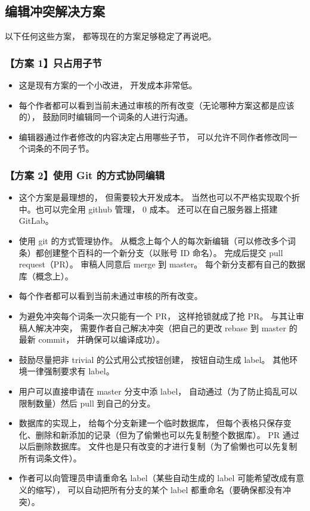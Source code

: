 \subsection{编辑冲突解决方案}

以下任何这些方案， 都等现在的方案足够稳定了再说吧。

\subsubsection{【方案 1】只占用子节}
\begin{itemize}
\item 这是现有方案的一个小改进， 开发成本非常低。
\item 每个作者都可以看到当前未通过审核的所有改变（无论哪种方案这都是应该的）， 鼓励同时编辑同一个词条的人进行沟通。
\item 编辑器通过作者修改的内容决定占用哪些子节， 可以允许不同作者修改同一个词条的不同子节。
\end{itemize}

\subsubsection{【方案 2】使用 Git 的方式协同编辑}
\begin{itemize}
\item 这个方案是最理想的， 但需要较大开发成本。 当然也可以不严格实现取个折中。也可以完全用 github 管理， 0 成本。 还可以在自己服务器上搭建 GitLab。
\item 使用 git 的方式管理协作。 从概念上每个人的每次新编辑（可以修改多个词条）都创建整个百科的一个新分支（以账号 ID 命名）。 完成后提交 pull request（PR）。 审稿人同意后 merge 到 master。 每个新分支都有自己的数据库（概念上）。
\item 每个作者都可以看到当前未通过审核的所有改变。
\item 为避免冲突每个词条一次只能有一个 PR， 这样抢锁就成了抢 PR。 与其让审稿人解决冲突， 需要作者自己解决冲突（把自己的更改 rebase 到 master 的最新 commit， 并确保可以编译成功）。
\item 鼓励尽量把非 trivial 的公式用公式按钮创建， 按钮自动生成 label。 其他环境一律强制要求有 label。
\item 用户可以直接申请在 master 分支中添 label， 自动通过（为了防止捣乱可以限制数量）然后 pull 到自己的分支。
\item 数据库的实现上， 给每个分支新建一个临时数据库， 但每个表格只保存变化、删除和新添加的记录（但为了偷懒也可以先复制整个数据库）。 PR 通过以后删除数据库。 文件也是只有改变的才进行复制（为了偷懒也可以先复制所有词条文件）。
\item 作者可以向管理员申请重命名 label（某些自动生成的 label 可能希望改成有意义的缩写）， 可以自动把所有分支的某个 label 都重命名（要确保都没有冲突）。
\end{itemize}

